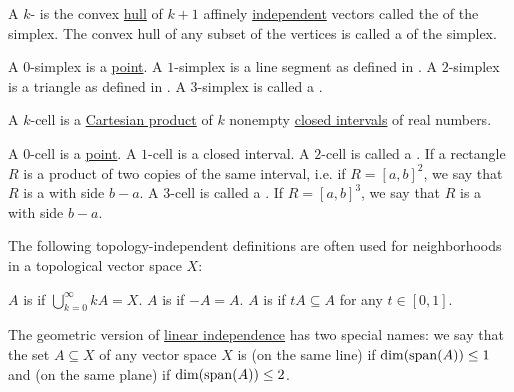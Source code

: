 \begin{definition}\label{def:simplex}
  A \( k \)- is the convex \hyperref[def:convex_set/hull]{hull} of \( k + 1 \) affinely \hyperref[affine_independence]{independent} vectors called the  of the simplex. The convex hull of any subset of the vertices is called a  of the simplex.

  \begin{DefEnum}
     A \( 0 \)-simplex is a \hyperref[def:point]{point}.
     A \( 1 \)-simplex is a line segment as defined in .
     A \( 2 \)-simplex is a triangle as defined in .
     A \( 3 \)-simplex is called a .
  \end{DefEnum}
\end{definition}

\begin{definition}\label{def:k_cell}
  A \( k \)-cell is a \hyperref[def:cartesian_product]{Cartesian product} of \( k \) nonempty \hyperref[def:total_order_interval/closed]{closed intervals} of real numbers.

  \begin{DefEnum}
     A \( 0 \)-cell is a \hyperref[def:point]{point}.
     A \( 1 \)-cell is a closed interval.
     A \( 2 \)-cell is called a . If a rectangle \( R \) is a product of two copies of the same interval, i.e. if \( R = [a, b]^2 \), we say that \( R \) is a  with side \( b - a \).
     A \( 3 \)-cell is called a . If \( R = [a, b]^3 \), we say that \( R \) is a  with side \( b - a \).
  \end{DefEnum}
\end{definition}

\begin{definition}\label{def:neighborhood_set_types}
  The following topology-independent definitions are often used for neighborhoods in a topological vector space \( X \):

  \begin{DefEnum}
     \( A \) is  if \( \bigcup_{k=0}^\infty kA = X \).
     \( A \) is  if \( -A = A \).
     \( A \) is  if \( tA \subseteq A \) for any \( t \in [0, 1] \).
  \end{DefEnum}
\end{definition}

\begin{definition}\label{def:collinear_complanar}
  The geometric version of \hyperref[def:left_module_linear_dependence]{linear independence} has two special names: we say that the set \( A \subseteq X \) of any vector space \( X \) is  (on the same line) if \( \dim(\operatorname{span}(A)) \leq 1 \) and  (on the same plane) if \( \dim(\operatorname{span}(A)) \leq 2 \).
\end{definition}
